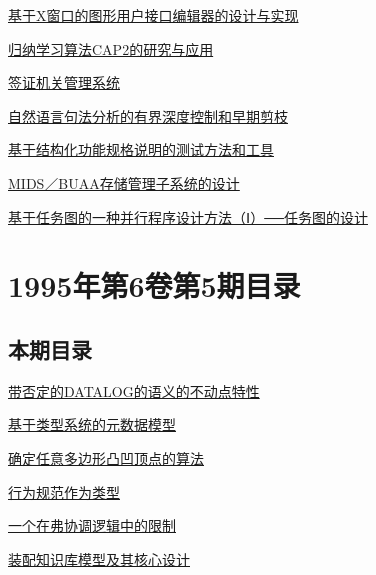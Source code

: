 \documentclass[a4paper]{article}
\begin{document}
\href{http://www.jos.org.cn/ch/reader/download_pdf.aspx?file_no=19950603&year_id=1995&quarter_id=6&falg=1}{基于X窗口的图形用户接口编辑器的设计与实现}

\href{http://www.jos.org.cn/ch/reader/download_pdf.aspx?file_no=19950604&year_id=1995&quarter_id=6&falg=1}{归纳学习算法CAP2的研究与应用}

\href{http://www.jos.org.cn/ch/reader/download_pdf.aspx?file_no=19950605&year_id=1995&quarter_id=6&falg=1}{签证机关管理系统}

\href{http://www.jos.org.cn/ch/reader/download_pdf.aspx?file_no=19950606&year_id=1995&quarter_id=6&falg=1}{自然语言句法分析的有界深度控制和早期剪枝}

\href{http://www.jos.org.cn/ch/reader/download_pdf.aspx?file_no=19950607&year_id=1995&quarter_id=6&falg=1}{基于结构化功能规格说明的测试方法和工具}

\href{http://www.jos.org.cn/ch/reader/download_pdf.aspx?file_no=19950608&year_id=1995&quarter_id=6&falg=1}{MIDS／BUAA存储管理子系统的设计}

\href{http://www.jos.org.cn/ch/reader/download_pdf.aspx?file_no=19950609&year_id=1995&quarter_id=6&falg=1}{基于任务图的一种并行程序设计方法（Ⅰ）──任务图的设计}


\section{\textbf{1995年第6卷第5期目录}}
\subsection{本期目录}
\href{http://www.jos.org.cn/ch/reader/download_pdf.aspx?file_no=19950501&year_id=1995&quarter_id=5&falg=1}{带否定的DATALOG的语义的不动点特性}

\href{http://www.jos.org.cn/ch/reader/download_pdf.aspx?file_no=19950502&year_id=1995&quarter_id=5&falg=1}{基于类型系统的元数据模型}

\href{http://www.jos.org.cn/ch/reader/download_pdf.aspx?file_no=19950503&year_id=1995&quarter_id=5&falg=1}{确定任意多边形凸凹顶点的算法}

\href{http://www.jos.org.cn/ch/reader/download_pdf.aspx?file_no=19950504&year_id=1995&quarter_id=5&falg=1}{行为规范作为类型}

\href{http://www.jos.org.cn/ch/reader/download_pdf.aspx?file_no=19950505&year_id=1995&quarter_id=5&falg=1}{一个在弗协调逻辑中的限制}

\href{http://www.jos.org.cn/ch/reader/download_pdf.aspx?file_no=19950506&year_id=1995&quarter_id=5&falg=1}{装配知识库模型及其核心设计}
\end{document}
